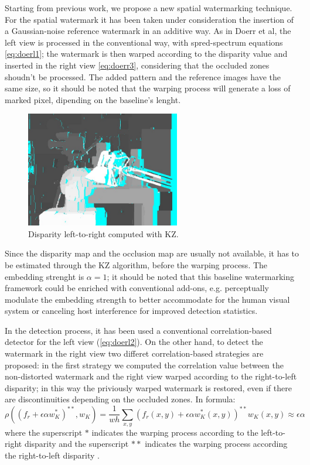 Starting from previous work, we propose a new spatial watermarking technique. \newline
For the spatial watermark it has been taken under consideration the insertion of a Gaussian-noise reference watermark in an additive way.\newline
As in Doerr et al, the left view is processed in the conventional way, with spred-spectrum equations \ref{eq:doerl1}; the watermark is then warped according to the disparity value and inserted in the right view \ref{eq:doerr3}, considering that the occluded zones shoudn't be processed.\newline
The added pattern and the reference images have the same size, so it should be noted that the warping process will generate a loss of marked pixel, dipending on the baseline's lenght.\newline
\begin{figure}[h!]
\centering
\includegraphics[width=0.6\textwidth]{./img/disp_left_to_right.jpg}
\caption{\small{Disparity left-to-right computed with KZ.}}
\label{fig:kzdisplr}
\end{figure}
Since the disparity map and the occlusion map are usually not available, it has to be estimated through the KZ algorithm, before the warping process.\newline
The embedding strenght is $\alpha=1$; it should be noted that this baseline watermarking framework could be enriched with conventional add-ons, e.g. perceptually modulate the embedding strength to better accommodate for the human visual system or canceling host interference for improved detection statistics.\newline

In the detection process, it has been used a conventional correlation-based detector for the left view (\ref{eq:doerl2}).\newline 
On the other hand, to detect the watermark in the right view two differet correlation-based strategies are proposed:
in the first strategy we computed the correlation value between the non-distorted watermark and the right view warped according to the right-to-left disparity; in this way the priviously warped watermark is restored, even if there are discontinuities depending on the occluded zones. In formula:
$$\rho((f_{r}+\epsilon\alpha w_{K}^{*})^{**},w_{K})= \frac{1}{wh}\sum_{x,y}(f_{r}(x,y)+\epsilon\alpha w_{K}^{*}(x,y))^{**}w_{K}(x,y)\approx\epsilon\alpha $$
where the superscript $*$ indicates the warping process according to the left-to-right disparity and the superscript $**$ indicates the warping process according the right-to-left disparity .\newline

